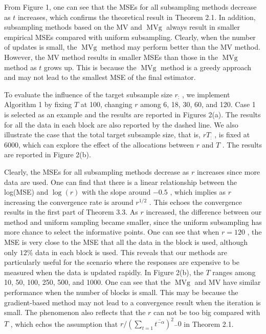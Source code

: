 \documentclass[
  10
]{article}
\begin{document}
From Figure 1, one can see that the MSEs for all subsampling methods
decrease as \(t\) increases, which confirms the theoretical result in
Theorem 2.1. In addition, subsampling methods based on the MV and
\(\operatorname { M V g }\) always result in smaller empirical MSEs
compared with uniform subsampling. Clearly, when the number of updates
is small, the \(\operatorname { M V g }\) method may perform better than
the MV method. However, the MV method results in smaller MSEs than those
in the \(\operatorname { M V g }\) method as \(t\) grows up. This is
because the \(\operatorname { M V g }\) method is a greedy approach and
may not lead to the smallest MSE of the final estimator.

To evaluate the influence of the target subsample size \(r _ { : }\) ,
we implement Algorithm 1 by fixing \(T\) at 100, changing \(r\) among 6,
18, 30, 60, and 120. Case 1 is selected as an example and the results
are reported in Figures 2(a). The results for all the data in each block
are also reported by the dashed line. We also illustrate the case that
the total target subsample size, that is, \(r T _ { : }\) , is fixed at
6000, which can explore the effect of the allocations between \(r\) and
\(T\) . The results are reported in Figure 2(b).

Clearly, the MSEs for all subsampling methods decrease as \(r\)
increases since more data are used. One can find that there is a linear
relationship between the log(MSE) and \(\log ( r )\) with the slope
around \(- 0 . 5\) , which implies as \(r\) increasing the convergence
rate is around \(r ^ { 1 / 2 }\) . This echoes the convergence results
in the first part of Theorem 3.3. As \(r\) increased, the difference
between our method and uniform sampling became smaller, since the
uniform subsampling has more chance to select the informative points.
One can see that when \(r = 1 2 0\) , the MSE is very close to the MSE
that all the data in the block is used, although only \(12 \%\) data in
each block is used. This reveals that our methods are particularly
useful for the scenario where the responses are expensive to be measured
when the data is updated rapidly. In Figure 2(b), the \(T\) ranges among
10, 50, 100, 250, 500, and 1000. One can see that the
\(\operatorname { M V g }\) and MV have similar performance when the
number of blocks is small. This may be because the gradient-based method
may not lead to a convergence result when the iteration is small. The
phenomenon also reflects that the \(r\) can not be too big compared with
\(T\) , which echos the assumption that
\(r / ( \sum _ { t = 1 } \bar { t ^ { - \alpha } } ) ^ { 2 } \stackrel { - } {  } 0\)
in Theorem 2.1.
\end{document}
